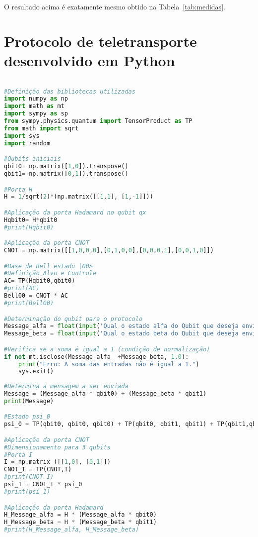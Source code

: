 O resultado acima é exatamente mesmo obtido na Tabela~\ref{tab:medidas}.

\clearpage

\chapter{Protocolo de teletransporte desenvolvido em Python}\label{app:protocolo}
\begin{lstlisting}[language=Python, caption=Protocolo de Teletransporte]

#Definição das bibliotecas utilizadas
import numpy as np
import math as mt
import sympy as sp
from sympy.physics.quantum import TensorProduct as TP
from math import sqrt
import sys
import random

#Qubits iniciais
qbit0= np.matrix([1,0]).transpose()
qbit1= np.matrix([0,1]).transpose()

#Porta H
H = 1/sqrt(2)*(np.matrix([[1,1], [1,-1]]))

#Aplicação da porta Hadamard no qubit qx
Hqbit0= H*qbit0
#print(Hqbit0)

#Aplicação da porta CNOT
CNOT = np.matrix([[1,0,0,0],[0,1,0,0],[0,0,0,1],[0,0,1,0]])

#Base de Bell estado |00>
#Definição Alvo e Controle
AC= TP(Hqbit0,qbit0)
#print(AC)
Bell00 = CNOT * AC
#print(Bell00)

#Determinação do qubit para o protocolo
Message_alfa = float(input('Qual o estado alfa do Qubit que deseja enviar?'))
Message_beta = float(input('Qual o estado beta do Qubit que deseja enviar?'))

#Verifica se a soma é igual a 1 (condição de normalização)
if not mt.isclose(Message_alfa  +Message_beta, 1.0):
    print("Erro: A soma das entradas não é igual a 1.")
    sys.exit()
    
#Determina a mensagem a ser enviada
Message = (Message_alfa * qbit0) + (Message_beta * qbit1)
print(Message)

#Estado psi_0 
psi_0 = TP(qbit0, qbit0, qbit0) + TP(qbit0, qbit1, qbit1) + TP(qbit1,qbit0, qbit0) + TP(qbit1,qbit1,qbit1)

#Aplicação da porta CNOT
#Dimensionamento para 3 qubits
#Porta I
I = np.matrix ([[1,0], [0,1]])
CNOT_I = TP(CNOT,I)
#print(CNOT_I)
psi_1 = CNOT_I * psi_0
#print(psi_1)

#Aplicação da porta Hadamard
H_Message_alfa = H * (Message_alfa * qbit0)
H_Message_beta = H * (Message_beta * qbit1)
#print(H_Message_alfa, H_Message_beta)


\end{lstlisting}
